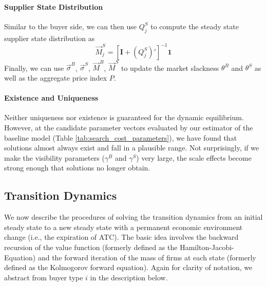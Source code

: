 \documentclass[12pt]{article} \usepackage{amsmath,amssymb,amsthm,geometry,graphicx,setspace,algorithm,algpseudocode,float}
\begin{document}
\paragraph{Supplier State Distribution} 

Similar to the buyer side, we can then use $Q_j^S$ to compute the steady state supplier state distribution as 
\[
  \vec{M}_j^S =  [\mathbf{I} + (Q_j^S)']^{-1} \mathbf{1} 
\]
Finally, we can use $\vec{\sigma}^B$, $\vec{\sigma}^S$, $\vec{M}^B$, $\vec{M}^S$ to update the market slackness $\theta^B$ and $\theta^S$ as well as the aggregate price index $P$. 

\paragraph{Existence and Uniqueness} 
Neither uniqueness nor existence is guaranteed for the dynamic equilibrium. However, at the candidate parameter vectors evaluated by our estimator of the baseline model (Table \ref{tab:search_cost_parameters}), we have found that solutions almost always exist and fall in a plausible range. Not surprisingly, if we make the visibility parameters ($\gamma^B$ and $\gamma^S$) very large, the scale effects become strong enough that solutions no longer obtain.

\subsection{Transition Dynamics} 
\label{app:trans_dynamics}
We now describe the procedures of solving the transition dynamics from an initial steady state to a new steady state with a permanent economic environment change (i.e., the expiration of ATC). The basic idea involves the backward recursion of the value function (formerly defined as the Hamilton-Jacobi-Equation) and the forward iteration of the mass of firms at each state (formerly defined as the Kolmogorov forward equation). Again for clarity of notation, we abstract from buyer type $i$ in the description below. 
\end{document}

